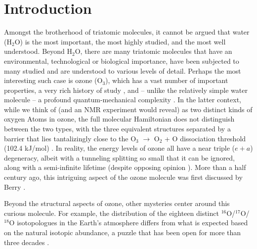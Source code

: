 \documentclass[12pt,pra,aps,superscriptaddress]{revtex4-2}
\begin{document}
\maketitle

\section{Introduction}

Amongst the brotherhood of triatomic molecules, it cannot be argued that water
(H$_2$O) is the most important, the most highly studied, and the most well
understood.  Beyond H$_2$O, there are many triatomic molecules that have an
environmental, technological or biological importance, have been subjected to
many studied and are understood to various levels of detail.  Perhaps the most
interesting such case is ozone (O$_3$), which has a vast number of important
properties, a very rich history of study \cite{chappuis}, and – unlike the
relatively simple water molecule – a profound quantum-mechanical complexity
\cite{Babikov:anomalousOzone:2003}.  In the latter context, while we think of
(and an NMR experiment would reveal) as two distinct kinds of oxygen Atoms in
ozone, the full molecular Hamiltonian does not distinguish between the two
types, with the three equivalent structures separated by a barrier that lies
tantalizingly close to the O$_3$ $\rightarrow$ O$_2$ + O dissociation
threshold (102.4 kJ/mol) \cite{Ruscis:ATcT:2022}. In reality, the energy
levels of ozone all have a near triple ($e+a$) degeneracy, albeit with a
tunneling splitting so small that it can be ignored, along with a
semi-infinite lifetime (despite opposing opinion
\cite{Boggs:BerryOzone:2006}).   More than a half century ago, this intriguing
aspect of the ozone molecule was first discussed by Berry
\cite{Berry:Ozone:1960}.

Beyond the structural aspects of ozone, other mysteries center around this
curious molecule.  For example, the distribution of the eighteen distinct
$^{16}$O/$^{17}$O/$^{18}$O isotopologues in the Earth’s atmosphere differs
from what is expected based on the natural isotopic abundance, a puzzle that
has been open for more than three decades
\cite{Mauersberger:OzoneMystery:1990}. 
\end{document}
